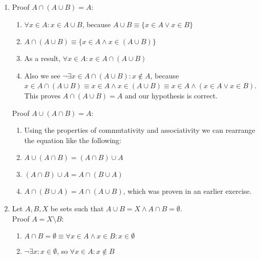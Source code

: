 \documentclass{article}
\begin{document}
\begin{enumerate}
        \item Proof $A \cap (A \cup B) = A$:
            \begin{enumerate}
                \item $\forall x \in A: x \in A \cup B$, because $A \cup B \equiv \{x \in A \lor x \in B\}$
                \item $A \cap (A \cup B) \equiv \{x \in A \land x \in (A \cup B)\}$
                \item As a result, $\forall x \in A: x \in A \cap (A \cup B)$
                \item Also we see $\neg\exists x \in A \cap (A \cup B) : x
                    \notin A$, because $x \in A \cap (A \cup B) \equiv x \in A
                    \land x \in (A \cup B) \equiv x \in A \land (x \in A \lor x
                    \in B)$. This proves $A \cap (A \cup B) = A$ and our
                    hypothesis is correct.
            \end{enumerate}
            Proof $A \cup (A \cap B) = A$:
            \begin{enumerate}
                \item Using the properties of commutativity and associativity we can rearrange the equation like the following:
                \item $A \cup (A \cap B) = (A \cap B) \cup A$
                \item $(A \cap B) \cup A = A \cap (B \cup A)$
                \item $A \cap (B \cup A) = A \cap (A \cup B)$, which was proven in an earlier exercise.
            \end{enumerate}
        \item Let $A, B, X$ be sets such that $A \cup B = X \land A \cap B = \emptyset$. \\
            Proof $A = X \setminus B$:
            \begin{enumerate}
                \item $A \cap B = \emptyset \equiv \forall x \in A \land x \in B: x \in \emptyset$
                \item $\neg\exists x : x \in \emptyset$, so $\forall x \in A: x \notin B$

\end{enumerate}
\end{enumerate}
\end{document}
